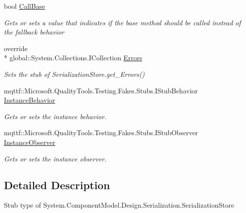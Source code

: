 \begin{DoxyCompactItemize}
\item 
bool \hyperlink{class_system_1_1_component_model_1_1_design_1_1_serialization_1_1_fakes_1_1_stub_serialization_store_aadb331ad8d68b2036c5426a0ceeab994}{Call\-Base}
\begin{DoxyCompactList}\small\item\em Gets or sets a value that indicates if the base method should be called instead of the fallback behavior\end{DoxyCompactList}\item 
override \\*
global\-::\-System.\-Collections.\-I\-Collection \hyperlink{class_system_1_1_component_model_1_1_design_1_1_serialization_1_1_fakes_1_1_stub_serialization_store_ae9b04ea3115a80886da9468075f57859}{Errors}
\begin{DoxyCompactList}\small\item\em Sets the stub of Serialization\-Store.\-get\-\_\-\-Errors()\end{DoxyCompactList}\item 
mqttf\-::\-Microsoft.\-Quality\-Tools.\-Testing.\-Fakes.\-Stubs.\-I\-Stub\-Behavior \hyperlink{class_system_1_1_component_model_1_1_design_1_1_serialization_1_1_fakes_1_1_stub_serialization_store_a345800553a81450349090ebbb40f1687}{Instance\-Behavior}
\begin{DoxyCompactList}\small\item\em Gets or sets the instance behavior.\end{DoxyCompactList}\item 
mqttf\-::\-Microsoft.\-Quality\-Tools.\-Testing.\-Fakes.\-Stubs.\-I\-Stub\-Observer \hyperlink{class_system_1_1_component_model_1_1_design_1_1_serialization_1_1_fakes_1_1_stub_serialization_store_af729c5c3f007e2cb205feee00e9664a1}{Instance\-Observer}
\begin{DoxyCompactList}\small\item\em Gets or sets the instance observer.\end{DoxyCompactList}\end{DoxyCompactItemize}


\subsection{Detailed Description}
Stub type of System.\-Component\-Model.\-Design.\-Serialization.\-Serialization\-Store



